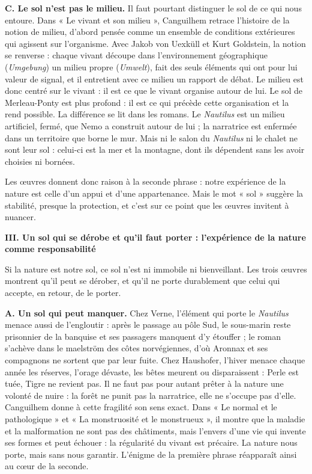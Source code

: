 \documentclass[11pt,a4paper]{article}
\begin{document}
\textbf{C. Le sol n'est pas le milieu.} Il faut pourtant distinguer le sol de ce qui nous entoure. Dans « Le vivant et son milieu », Canguilhem retrace l'histoire de la notion de milieu, d'abord pensée comme un ensemble de conditions extérieures qui agissent sur l'organisme. Avec Jakob von Uexküll et Kurt Goldstein, la notion se renverse : chaque vivant découpe dans l'environnement géographique (\emph{Umgebung}) un milieu propre (\emph{Umwelt}), fait des seuls éléments qui ont pour lui valeur de signal, et il entretient avec ce milieu un rapport de débat. Le milieu est donc centré sur le vivant : il est ce que le vivant organise autour de lui. Le sol de Merleau-Ponty est plus profond : il est ce qui précède cette organisation et la rend possible. La différence se lit dans les romans. Le \emph{Nautilus} est un milieu artificiel, fermé, que Nemo a construit autour de lui ; la narratrice est enfermée dans un territoire que borne le mur. Mais ni le salon du \emph{Nautilus} ni le chalet ne sont leur sol : celui-ci est la mer et la montagne, dont ils dépendent sans les avoir choisies ni bornées.

Les œuvres donnent donc raison à la seconde phrase : notre expérience de la nature est celle d'un appui et d'une appartenance. Mais le mot « sol » suggère la stabilité, presque la protection, et c'est sur ce point que les œuvres invitent à nuancer.

\textbf{III. Un sol qui se dérobe et qu'il faut porter : l'expérience de la nature comme responsabilité}

Si la nature est notre sol, ce sol n'est ni immobile ni bienveillant. Les trois œuvres montrent qu'il peut se dérober, et qu'il ne porte durablement que celui qui accepte, en retour, de le porter.

\textbf{A. Un sol qui peut manquer.} Chez Verne, l'élément qui porte le \emph{Nautilus} menace aussi de l'engloutir : après le passage au pôle Sud, le sous-marin reste prisonnier de la banquise et ses passagers manquent d'y étouffer ; le roman s'achève dans le maelström des côtes norvégiennes, d'où Aronnax et ses compagnons ne sortent que par leur fuite. Chez Haushofer, l'hiver menace chaque année les réserves, l'orage dévaste, les bêtes meurent ou disparaissent : Perle est tuée, Tigre ne revient pas. Il ne faut pas pour autant prêter à la nature une volonté de nuire : la forêt ne punit pas la narratrice, elle ne s'occupe pas d'elle. Canguilhem donne à cette fragilité son sens exact. Dans « Le normal et le pathologique » et « La monstruosité et le monstrueux », il montre que la maladie et la malformation ne sont pas des châtiments, mais l'envers d'une vie qui invente ses formes et peut échouer : la régularité du vivant est précaire. La nature nous porte, mais sans nous garantir. L'énigme de la première phrase réapparaît ainsi au cœur de la seconde.
\end{document}
